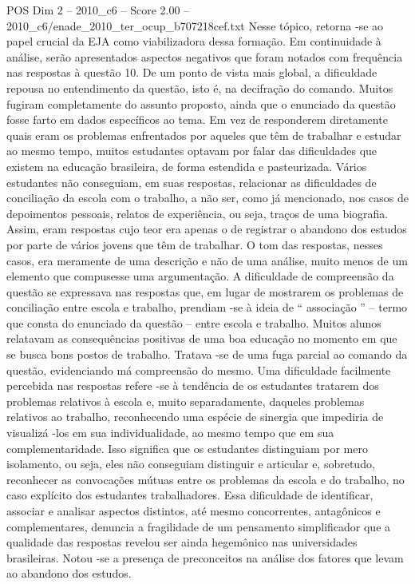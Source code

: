 \begin{textsample}{POS Dim 2 – 2010\_c6 – Score 2.00 – 2010\_c6/enade\_2010\_ter\_ocup\_b707218cef.txt}
Nesse tópico, retorna -se ao papel crucial da EJA como viabilizadora dessa formação.
Em continuidade à análise, serão apresentados aspectos negativos que foram notados com frequência nas respostas à questão 10.
De um ponto de vista mais global, a dificuldade repousa no entendimento da questão, isto é, na decifração do comando.
Muitos fugiram completamente do assunto proposto, ainda que o enunciado da questão fosse farto em dados específicos ao tema.
Em vez de responderem diretamente quais eram os problemas enfrentados por aqueles que têm de trabalhar e estudar ao mesmo tempo, muitos estudantes optavam por falar das dificuldades que existem na educação brasileira, de forma estendida e pasteurizada.
Vários estudantes não conseguiam, em suas respostas, relacionar as dificuldades de conciliação da escola com o trabalho, a não ser, como já mencionado, nos casos de depoimentos pessoais, relatos de experiência, ou seja, traços de uma biografia.
Assim, eram respostas cujo teor era apenas o de registrar o abandono dos estudos por parte de vários jovens que têm de trabalhar.
O tom das respostas, nesses casos, era meramente de uma descrição e não de uma análise, muito menos de um elemento que compusesse uma argumentação.
A dificuldade de compreensão da questão se expressava nas respostas que, em lugar de mostrarem os problemas de conciliação entre escola e trabalho, prendiam -se à ideia de “ associação ” – termo que consta do enunciado da questão – entre escola e trabalho.
Muitos alunos relatavam as consequências positivas de uma boa educação no momento em que se busca bons postos de trabalho.
Tratava -se de uma fuga parcial ao comando da questão, evidenciando má compreensão do mesmo.
Uma dificuldade facilmente percebida nas respostas refere -se à tendência de os estudantes tratarem dos problemas relativos à escola e, muito separadamente, daqueles problemas relativos ao trabalho, reconhecendo uma espécie de sinergia que impediria de visualizá -los em sua individualidade, ao mesmo tempo que em sua complementaridade.
Isso significa que os estudantes distinguiam por mero isolamento, ou seja, eles não conseguiam distinguir e articular e, sobretudo, reconhecer as convocações mútuas entre os problemas da escola e do trabalho, no caso explícito dos estudantes trabalhadores.
Essa dificuldade de identificar, associar e analisar aspectos distintos, até mesmo concorrentes, antagônicos e complementares, denuncia a fragilidade de um pensamento simplificador que a qualidade das respostas revelou ser ainda hegemônico nas universidades brasileiras.
Notou -se a presença de preconceitos na análise dos fatores que levam ao abandono dos estudos.

\end{textsample}
